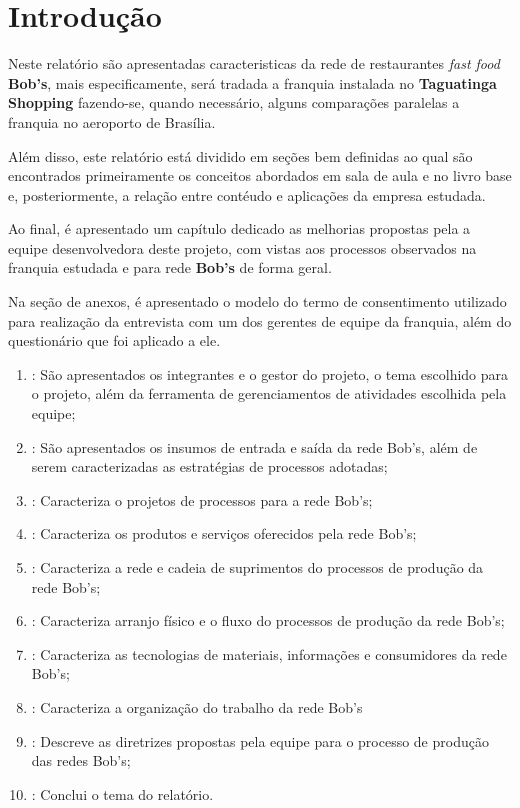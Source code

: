 \chapter[Introdução]{Introdução}
\label{chap:introducao}
	
	Neste relatório são apresentadas caracteristicas da rede de restaurantes \emph{fast food} \textbf{Bob's}, mais especificamente, será tradada a franquia instalada no \textbf{Taguatinga Shopping} fazendo-se, quando necessário, alguns comparações paralelas a franquia no aeroporto de Brasília.

	Além disso, este relatório está dividido em seções bem definidas ao qual são encontrados primeiramente os conceitos abordados em sala de aula e no livro base \cite{slack} e, posteriormente, a relação entre contéudo e aplicações da empresa estudada.

	Ao final, é apresentado um capítulo dedicado as melhorias propostas pela a equipe desenvolvedora deste projeto, com vistas aos processos observados na franquia estudada e para rede \textbf{Bob's} de forma geral.

	Na seção de anexos, é apresentado o modelo do termo de consentimento utilizado para realização da entrevista com um dos gerentes de equipe da franquia, além do questionário que foi aplicado a ele.

	\begin{enumerate}
		\item{\textbf{}: São apresentados os integrantes e o gestor do projeto, o tema escolhido para o projeto, além da ferramenta de gerenciamentos de atividades escolhida pela equipe;}
		\item{\textbf{}: São apresentados os insumos de entrada e saída da rede Bob's, além de serem caracterizadas as estratégias de processos adotadas;}
		\item{\textbf{}: Caracteriza o projetos de processos para a rede Bob's;}
		\item{\textbf{}: Caracteriza os produtos e serviços oferecidos pela rede Bob's;}
		\item{\textbf{}: Caracteriza a rede e cadeia de suprimentos do processos de produção da rede Bob's;}
		\item{\textbf{}: Caracteriza arranjo físico e o fluxo do processos de produção da rede Bob's;}
		\item{\textbf{}: Caracteriza as tecnologias de materiais, informações e consumidores da rede Bob's;}
		\item{\textbf{}: Caracteriza a organização do trabalho da rede Bob's}
		\item{\textbf{}: Descreve as diretrizes propostas pela equipe para o processo de produção das redes Bob's;}
		\item{\textbf{}: Conclui o tema do relatório.}
	\end{enumerate}
